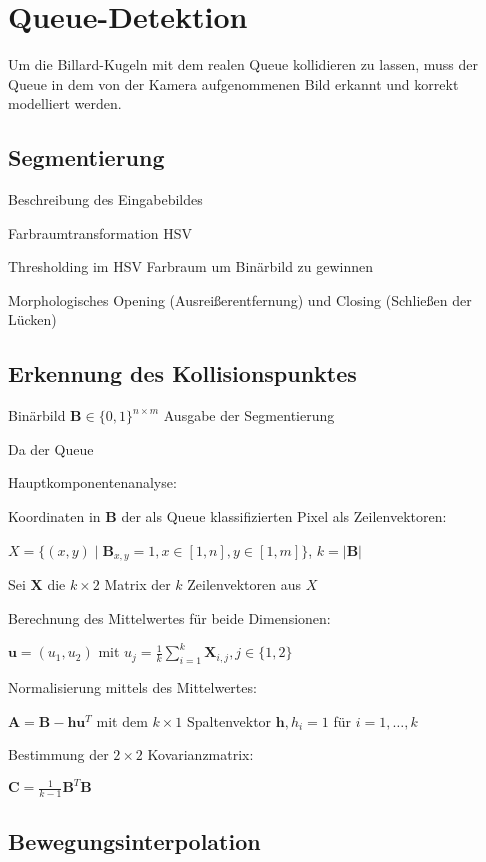 \section{Queue-Detektion}


Um die Billard-Kugeln mit dem realen Queue kollidieren zu lassen, muss der Queue in dem von der Kamera aufgenommenen Bild erkannt und korrekt modelliert werden. 






\subsection{Segmentierung}
Beschreibung des Eingabebildes

Farbraumtransformation HSV

Thresholding im HSV Farbraum um Binärbild zu gewinnen 

Morphologisches Opening (Ausreißerentfernung) und Closing (Schließen der Lücken)


\subsection{Erkennung des Kollisionspunktes}
Binärbild $\textbf{B} \in \{0, 1\}^{n\times m}$ Ausgabe der Segmentierung

Da der Queue 

Hauptkomponentenanalyse:

Koordinaten in $\textbf{B}$ der als Queue klassifizierten Pixel als Zeilenvektoren:

$X = \{(x, y) \mid \textbf{B}_{x,y} = 1, x \in [1,n], y \in [1,m]\}$, $k = |\textbf{B}|$

Sei $\textbf{X}$ die $k\times 2$ Matrix der $k$ Zeilenvektoren aus $X$

Berechnung des Mittelwertes für beide Dimensionen:

$\textbf{u} = (u_1, u_2)$ mit $u_j = \frac{1}{k}\sum_{i=1}^{k}\textbf{X}_{i, j}, j \in \{1,2\}$

Normalisierung mittels des Mittelwertes:

$\textbf{A} = \textbf{B} - \textbf{h}\textbf{u}^{T}$ mit dem $k\times 1$ Spaltenvektor $\textbf{h}, h_i = 1$ für $i = 1,\dots,k$

Bestimmung der $2\times2$ Kovarianzmatrix:

$\textbf{C} = \frac{1}{k-1} {\textbf{B}}^{T}  \textbf{B}$









\subsection{Bewegungsinterpolation}